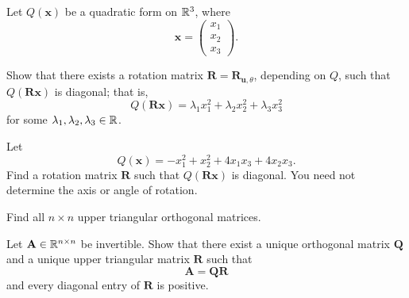 \documentclass[11pt,oneside]{article}
\begin{document}
\begin{problem}
Let $Q(\mathbf x)$ be a quadratic form on $\mathbb{R}^3$, where
\[
\mathbf x=
\begin{pmatrix}
x_1\\x_2\\x_3
\end{pmatrix}.
\]
\begin{problemsubparts}
\item Show that there exists a rotation matrix $\mathbf R=\mathbf R_{\mathbf u,\theta}$, depending on $Q$, such that $Q(\mathbf R\mathbf x)$ is diagonal; that is,
\[
Q(\mathbf R\mathbf x)=\lambda_1x_1^2+\lambda_2x_2^2+\lambda_3x_3^2
\]
for some $\lambda_1,\lambda_2,\lambda_3\in\mathbb{R}$.
\item Let
\[
Q(\mathbf x)=-x_1^2+x_2^2+4x_1x_3+4x_2x_3.
\]
Find a rotation matrix $\mathbf R$ such that $Q(\mathbf R\mathbf x)$ is diagonal. You need not determine the axis or angle of rotation.
\end{problemsubparts}
\end{problem}

\begin{problem}
Find all $n\times n$ upper triangular orthogonal matrices.
\end{problem}

\begin{problem}
Let $\mathbf A\in\mathbb{R}^{n\times n}$ be invertible. Show that there exist a unique orthogonal matrix $\mathbf Q$ and a unique upper triangular matrix $\mathbf R$ such that
\[
\mathbf A=\mathbf Q\mathbf R
\]
and every diagonal entry of $\mathbf R$ is positive.
\end{problem}
\end{document}
